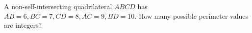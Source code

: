 A non-self-intersecting quadrilateral $ABCD$ has $AB=6,BC=7,CD=8,AC=9,BD=10$. How many possible perimeter values are integers?
